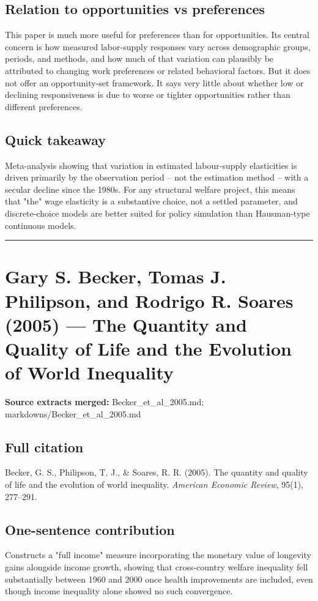 \documentclass[11pt,a4paper]{article}
\begin{document}
\subsection*{Relation to opportunities vs preferences}
This paper is much more useful for preferences than for opportunities. Its central concern is how measured labor-supply responses vary across demographic groups, periods, and methods, and how much of that variation can plausibly be attributed to changing work preferences or related behavioral factors. But it does not offer an opportunity-set framework. It says very little about whether low or declining responsiveness is due to worse or tighter opportunities rather than different preferences.

\subsection*{Quick takeaway}
Meta-analysis showing that variation in estimated labour-supply elasticities is driven primarily by the observation period -- not the estimation method -- with a secular decline since the 1980s. For any structural welfare project, this means that "the" wage elasticity is a substantive choice, not a settled parameter, and discrete-choice models are better suited for policy simulation than Hausman-type continuous models.


\medskip\hrule\medskip

\section*{Gary S. Becker, Tomas J. Philipson, and Rodrigo R. Soares (2005) — The Quantity and Quality of Life and the Evolution of World Inequality}

\textbf{Source extracts merged:} Becker\_et\_al\_2005.md; markdowns/Becker\_et\_al\_2005.md

\subsection*{Full citation}
Becker, G. S., Philipson, T. J., \& Soares, R. R. (2005). The quantity and quality of life and the evolution of world inequality. \textit{American Economic Review}, 95(1), 277--291.

\subsection*{One-sentence contribution}
Constructs a "full income" measure incorporating the monetary value of longevity gains alongside income growth, showing that cross-country welfare inequality fell substantially between 1960 and 2000 once health improvements are included, even though income inequality alone showed no such convergence.
\end{document}
